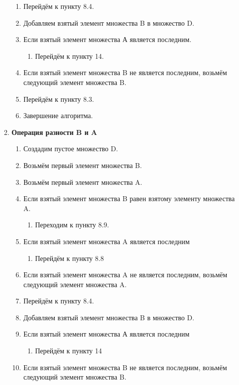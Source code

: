\documentclass[a4paper,12pt]{extarticle}
\begin{document}
\begin{enumerate}
\begin{enumerate}[label*=\arabic*.]
\begin{enumerate}[label*=\arabic*.]
    \item Перейдём к пункту 8.4.
    \item Добавляем взятый элемент множества B в множество D.
    \item Если взятый элемент множества А является последним.
    \begin{enumerate}[label*=\arabic*.]
      \item Перейдём к пункту 14.
    \end{enumerate}
    \item Если взятый элемент множества B не является последним, возьмём следующий элемент множества B.
    \item Перейдём к пункту 8.3.
    \item Завершение алгоритма.
  \end{enumerate}
  \item\textbf{Операция разности B и A}
  \begin{enumerate}[label*=\arabic*.]
    \item Создадим пустое множество D.
    \item Возьмём первый элемент множества B.
    \item Возьмём первый элемент множества A.
    \item Если взятый элемент множества B равен взятому элементу множества A.
    \begin{enumerate}[label*=\arabic*.]
      \item Переходим к пункту 8.9.
    \end{enumerate}
    \item Если взятый элемент множества A является последним
    \begin{enumerate}[label*=\arabic*.]
      \item Перейдём к пункту 8.8
    \end{enumerate}
    \item Если взятый элемент множества A не является последним, возьмём следующий элемент множества A.
    \item Перейдём к пункту 8.4.
    \item Добавляем взятый элемент множества B в множество D.
    \item Если взятый элемент множества А является последним
    \begin{enumerate}[label*=\arabic*.]
      \item Перейдём к пункту 14
    \end{enumerate}
    \item Если взятый элемент множества B не является последним, возьмём следующий элемент множества B.

\end{enumerate}
\end{enumerate}
\end{enumerate}
\end{document}
